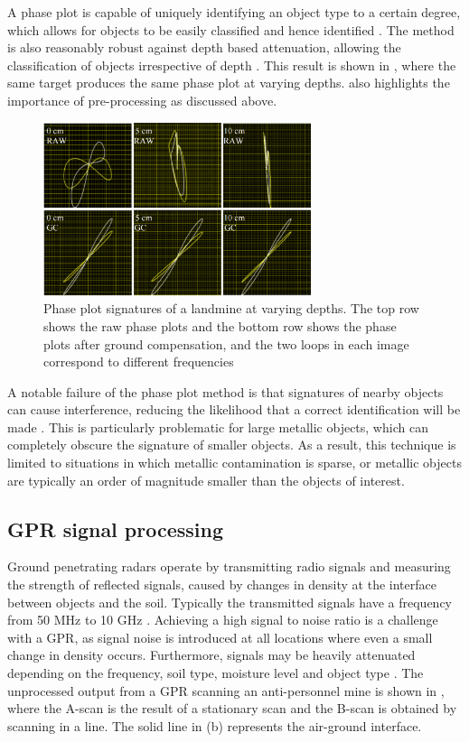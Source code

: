 \documentclass[main.tex]{subfiles}
\begin{document}
A phase plot is capable of uniquely identifying an object type to a certain degree, which allows for objects to be easily classified and hence identified \parencite{bruschini02}. The method is also reasonably robust against depth based attenuation, allowing the classification of objects irrespective of depth \parencite{Kruger2006}. This result is shown in , where the same target produces the same phase plot at varying depths.  also highlights the importance of pre-processing as discussed above.
\begin{figure}[ht]
\includegraphics[width=0.7\textwidth]{2-LiteratureReview/compensated-signature.png}
\centering
\caption[Phase plot signatures of a landmine at varying depths]{Phase plot signatures of a landmine at varying depths. The top row shows the raw phase plots and the bottom row shows the phase plots after ground compensation, and the two loops in each image correspond to different frequencies \parencite{Kruger2006}} 
\end{figure}

A notable failure of the phase plot method is that signatures of nearby objects can cause interference, reducing the likelihood that a correct identification will be made \parencite{Kruger2006}. This is particularly problematic for large metallic objects, which can completely obscure the signature of smaller objects. As a result, this technique is limited to situations in which metallic contamination is sparse, or metallic objects are typically an order of magnitude smaller than the objects of interest.

\subsection{GPR signal processing}
Ground penetrating radars operate by transmitting radio signals and measuring the strength of reflected signals, caused by changes in density at the interface between objects and the soil. Typically the transmitted signals have a frequency from 50 MHz to 10 GHz \parencite{Ho2008}. Achieving a high signal to noise ratio is a challenge with a GPR, as signal noise is introduced at all locations where even a small change in density occurs. Furthermore, signals may be heavily attenuated depending on the frequency, soil type, moisture level and object type \parencite{Annan20091}. The unprocessed output from a GPR scanning an anti-personnel mine is shown in , where the A-scan is the result of a stationary scan and the B-scan is obtained by scanning in a line. The solid line in  (b) represents the air-ground interface.
\end{document}
